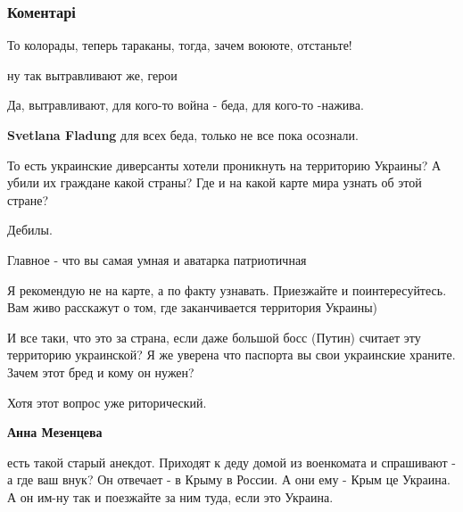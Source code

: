  
 
 
 
 
\subsubsection{Коментарі}

\begin{itemize} %
То колорады, теперь тараканы, тогда, зачем воююте, отстаньте!

\begin{itemize} %
ну так вытравливают же, герои

Да, вытравливают, для кого-то война - беда, для кого-то -нажива.

\textbf{Svetlana Fladung} для всех беда, только не все пока осознали.
\end{itemize} %


То есть украинские диверсанты хотели проникнуть на территорию Украины? А убили
их граждане какой страны? Где и на какой карте мира узнать об этой стране?

Дебилы.

\begin{itemize} %
Главное - что вы самая умная и аватарка патриотичная


Я рекомендую не на карте, а по факту узнавать. Приезжайте и поинтересуйтесь.
Вам живо расскажут о том, где заканчивается территория Украины)


И все таки, что это за страна, если даже большой босс (Путин) считает эту
территорию украинской? Я же уверена что паспорта вы свои украинские храните.
Зачем этот бред и кому он нужен?

Хотя этот вопрос уже риторический.

\textbf{Анна Мезенцева} 

есть такой старый анекдот. Приходят к деду домой из военкомата и спрашивают - а
где ваш внук? Он отвечает - в Крыму в России. А они ему - Крым це Украина. А он
им-ну так и поезжайте за ним туда, если это Украина.


\end{itemize}
\end{itemize}
